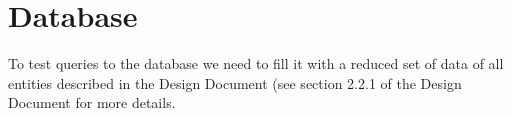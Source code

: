 \section{Database}
To test queries to the database we need to fill it with a reduced set of data of all entities described in the Design Document (see section 2.2.1 of the Design Document for more details.